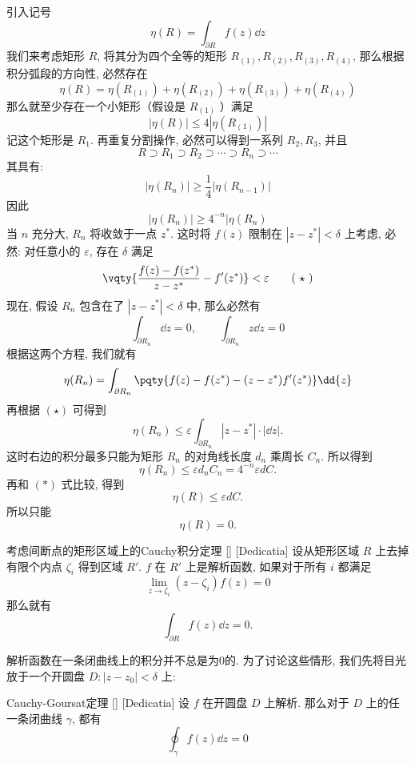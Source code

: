 \documentclass[UTF8]{ctexart}
\begin{document}
        \begin{prf}
            引入记号
            \[\eta(R)=\int_{\partial R}f(z)\dd{z}\]
            我们来考虑矩形 \(R\), 将其分为四个全等的矩形 \(R_{(1)}, R_{(2)}, R_{(3)}, R_{(4)}\), 那么根据积分弧段的方向性, 必然存在
            \[\eta(R)=\eta(R_{(1)})+\eta(R_{(2)})+\eta(R_{(3)})+\eta(R_{(4)})\]
            那么就至少存在一个小矩形（假设是 \(R_{(1)}\) ）满足
            \[|\eta(R)|\leqslant 4|\eta(R_{(1)})|\]
            记这个矩形是 \(R_1\). 再重复分割操作, 必然可以得到一系列 \(R_2, R_3\), 并且
            \[R\supset R_1\supset R_2\supset\cdots\supset R_n\supset\cdots\]
            其具有: 
            \[|\eta(R_n)|\geqslant \frac{1}{4}|\eta(R_{n-1})|\]
            因此
            \[|\eta(R_n)|\geqslant 4^{-n}|\eta(R_n)\tag{ \(\ast\) }\]
            当 \(n\) 充分大,  \(R_n\) 将收敛于一点 \(z^*\). 这时将 \(f(z)\) 限制在 \(|z-z^*|<\delta \) 上考虑, 必然: 对任意小的 \(\varepsilon\), 存在 \(\delta\) 满足
            \[\vqty{\frac{f(z)-f(z^*)}{z-z^*}-f'(z^*)}<\varepsilon\tag{ \(\star\) }\]
            现在, 假设 \(R_n\) 包含在了 \(|z-z^*|<\delta\) 中, 那么必然有
            \[\int_{\partial R_n}\dd{z}=0,\qquad\int_{\partial R_n}z\dd{z}=0\]
            根据这两个方程, 我们就有
            \[\eta(R_n)=\int_{\partial R_n}\pqty{f(z)-f(z^*)-(z-z^*)f'(z^*)}\dd{z}\]
            再根据 \((\star)\) 可得到
            \[\eta(R_n)\leqslant\varepsilon\int_{\partial R_n}|z-z^*|\cdot|\dd z|. \]
            这时右边的积分最多只能为矩形 \(R_n\) 的对角线长度 \(d_n\) 乘周长 \(C_n\). 所以得到
            \[\eta(R_n)\leqslant\varepsilon d_nC_n=4^{-n}\varepsilon dC.\]
            再和 \((\ast)\) 式比较, 得到
            \[\eta(R)\leqslant\varepsilon dC.\]
            所以只能
            \[\eta(R)=0.\]
        \end{prf}

        \begin{thm}
            [UUID]
            {考虑间断点的矩形区域上的Cauchy积分定理}
            []
            [Dedicatia]
            设从矩形区域 \(R\) 上去掉有限个内点 \(\zeta_i\) 得到区域 \(R'\).  \(f\) 在 \(R'\) 上是解析函数, 如果对于所有 \(i\) 都满足
            \[\lim_{z\to\zeta_i }(z-\zeta_i)f(z)=0\]
            那么就有
            \[\int_{\partial R}f(z)\dd{z}=0.\]
        \end{thm}

        解析函数在一条闭曲线上的积分并不总是为0的. 为了讨论这些情形, 我们先将目光放于一个开圆盘 \(D: |z-z_0|<\delta \) 上:

        \begin{thm}
            [UUID]
            {Cauchy-Goursat定理}
            []
            [Dedicatia]
            设 \(f\) 在开圆盘 \(D\) 上解析. 那么对于 \(D\) 上的任一条闭曲线 \(\gamma\), 都有
            \[\oint_\gamma f(z)\dd{z}=0\]
        \end{thm}
        
\end{document}
